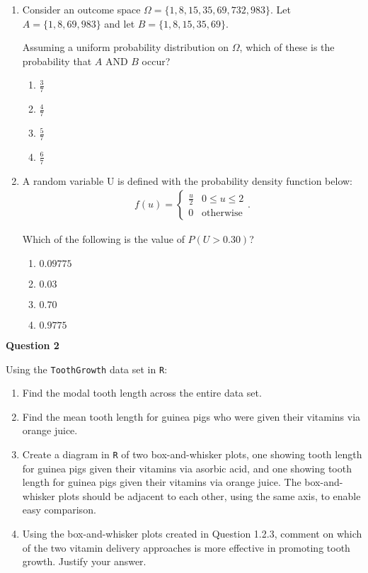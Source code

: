 \documentclass[11pt,a4paper]{article}
\begin{document}
\begin{enumerate}
\item Consider an outcome space $\Omega=\{1,8,15,35,69,732,983\}$. Let $A=\{1,8,69,983\}$ and let $B=\{1,8,15,35,69\}$.

Assuming a uniform probability distribution on $\Omega$, which of these is the probability that $A$ AND $B$ occur?

\begin{enumerate}
\item $\frac{3}{7}$
\item $\frac{4}{7}$
\item $\frac{5}{7}$
\item $\frac{6}{7}$
\end{enumerate}

\item A random variable U is defined with the probability density function below:
\begin{eqnarray*}
f(u)=\begin{cases} 
      \frac{u}{2} & 0\leq u \leq 2 \\
      0 & \text{otherwise}
   \end{cases}.
\end{eqnarray*}

Which of the following is the value of $P(U>0.30)$?

\begin{enumerate}
\item $0.09775$
\item $0.03$
\item $0.70$
\item $0.9775$
\end{enumerate}
\end{enumerate}
 

\textbf{Question 2}
\vspace{0.2cm}

Using the \texttt{ToothGrowth} data set in \texttt{R}:
\begin{enumerate}
\item Find the modal tooth length across the entire data set.
\item Find the mean tooth length for guinea pigs who were given their vitamins via orange juice.
\item Create a diagram in \texttt{R} of two box-and-whisker plots, one showing tooth length for guinea pigs given their vitamins via asorbic acid, and one showing tooth length for guinea pigs given their vitamins via orange juice. The box-and-whisker plots should be adjacent to each other, using the same axis, to enable easy comparison.
\item Using the box-and-whisker plots created in Question 1.2.3, comment on which of the two vitamin delivery approaches is more effective in promoting tooth growth. Justify your answer.
\end{enumerate}
\end{document}
